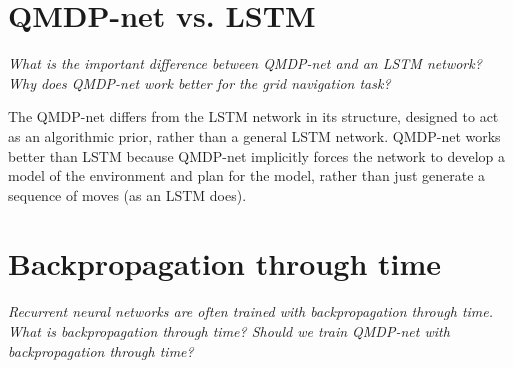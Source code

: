 \documentclass{article}[11pt]
\begin{document}
\section{QMDP-net vs. LSTM}
{\it
What is the important difference between QMDP-net and
an LSTM network? Why does QMDP-net work better
for the grid navigation task? 
}
\newline

The QMDP-net differs from the LSTM network in its structure,
designed to act as an algorithmic prior, rather than a general
LSTM network. QMDP-net works better than LSTM because QMDP-net
implicitly forces the network to develop a model of the
environment and plan for the model, rather than just generate
a sequence of moves (as an LSTM does).


\section{Backpropagation through time}
{\it
Recurrent neural networks are often trained with
backpropagation through time. What is backpropagation
through time? Should we train QMDP-net with
backpropagation through time?
}
\newline




\end{document}
